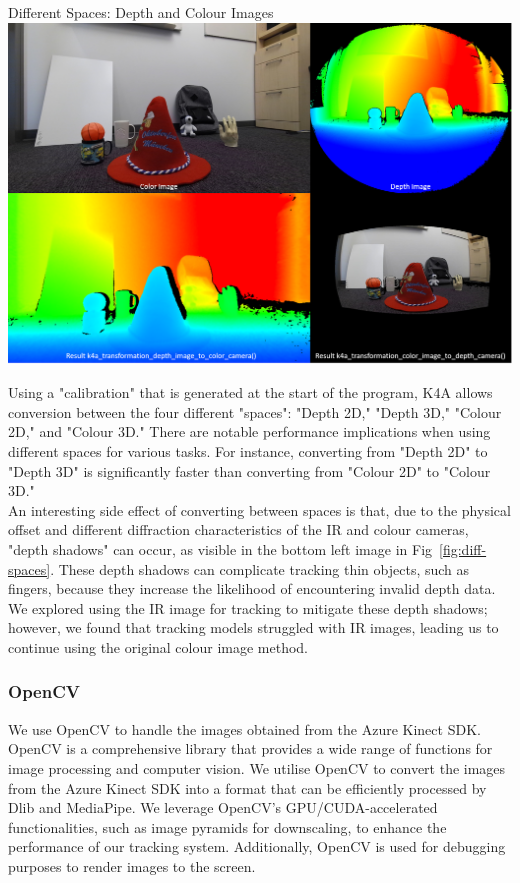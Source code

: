 \begin{figureBox}[label={fig:diff-spaces}, width=0.8\linewidth]{Different Spaces: Depth and Colour Images \cite{noauthor_use_nodate}}
    \includegraphics[width=1.0\linewidth]{./implementation/figures/different spaces.png}
\end{figureBox}

Using a "calibration" that is generated at the start of the program, K4A allows conversion between the four different "spaces": "Depth 2D," "Depth 3D," "Colour 2D," and "Colour 3D." There are notable performance implications when using different spaces for various tasks. For instance, converting from "Depth 2D" to "Depth 3D" is significantly faster than converting from "Colour 2D" to "Colour 3D." \\

An interesting side effect of converting between spaces is that, due to the physical offset and different diffraction characteristics of the IR and colour cameras, "depth shadows" \cite{Kersten1997-so} can occur, as visible in the bottom left image in Fig~\ref{fig:diff-spaces}. These depth shadows can complicate tracking thin objects, such as fingers, because they increase the likelihood of encountering invalid depth data. We explored using the IR image for tracking to mitigate these depth shadows; however, we found that tracking models struggled with IR images, leading us to continue using the original colour image method.

\subsubsection{OpenCV}

We use OpenCV \cite{bradski2008learning} to handle the images obtained from the Azure Kinect SDK. OpenCV is a comprehensive library that provides a wide range of functions for image processing and computer vision. We utilise OpenCV to convert the images from the Azure Kinect SDK into a format that can be efficiently processed by Dlib and MediaPipe. We leverage OpenCV's GPU/CUDA-accelerated functionalities, such as image pyramids for downscaling, to enhance the performance of our tracking system. Additionally, OpenCV is used for debugging purposes to render images to the screen.

